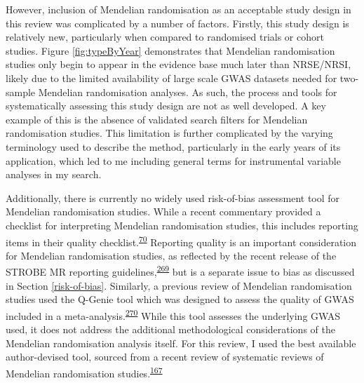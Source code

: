 \documentclass[a4paper, twoside]{templates/ociamthesis}
\begin{document}
However, inclusion of Mendelian randomisation as an acceptable study design in this review was complicated by a number of factors. Firstly, this study design is relatively new, particularly when compared to randomised trials or cohort studies. Figure \ref{fig:typeByYear} demonstrates that Mendelian randomisation studies only begin to appear in the evidence base much later than NRSE/NRSI, likely due to the limited availability of large scale GWAS datasets needed for two-sample Mendelian randomisation analyses. As such, the process and tools for systematically assessing this study design are not as well developed. A key example of this is the absence of validated search filters for Mendelian randomisation studies. This limitation is further complicated by the varying terminology used to describe the method, particularly in the early years of its application, which led to me including general terms for instrumental variable analyses in my search.

Additionally, there is currently no widely used risk-of-bias assessment tool for Mendelian randomisation studies. While a recent commentary provided a checklist for interpreting Mendelian randomisation studies, this includes reporting items in their quality checklist.\textsuperscript{\protect\hyperlink{ref-davies2018}{70}} Reporting quality is an important consideration for Mendelian randomisation studies, as reflected by the recent release of the STROBE MR reporting guidelines,\textsuperscript{\protect\hyperlink{ref-skrivankova2021}{269}} but is a separate issue to bias as discussed in Section \ref{risk-of-bias}. Similarly, a previous review of Mendelian randomisation studies used the Q-Genie tool which was designed to assess the quality of GWAS included in a meta-analysis.\textsuperscript{\protect\hyperlink{ref-sohani2015}{270}} While this tool assesses the underlying GWAS used, it does not address the additional methodological considerations of the Mendelian randomisation analysis itself. For this review, I used the best available author-devised tool, sourced from a recent review of systematic reviews of Mendelian randomisation studies.\textsuperscript{\protect\hyperlink{ref-spiga2021}{167}}
\end{document}
